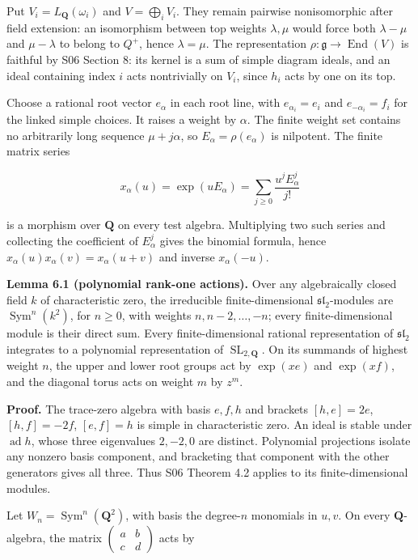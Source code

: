 \documentclass[11pt,a4paper,openany]{report}
\begin{document}
Put \(V_i=L_{\mathbf Q}(\omega_i)\) and \(V=\bigoplus_iV_i\). They remain pairwise nonisomorphic after field extension: an isomorphism between top weights \(\lambda,\mu\) would force both \(\lambda-\mu\) and \(\mu-\lambda\) to belong to \(Q^+\), hence \(\lambda=\mu\). The representation \(\rho:\mathfrak g\to\operatorname{End}(V)\) is faithful by S06 Section 8: its kernel is a sum of simple diagram ideals, and an ideal containing index \(i\) acts nontrivially on \(V_i\), since \(h_i\) acts by one on its top.

Choose a rational root vector \(e_\alpha\) in each root line, with \(e_{\alpha_i}=e_i\) and \(e_{-\alpha_i}=f_i\) for the linked simple choices. It raises a weight by \(\alpha\). The finite weight set contains no arbitrarily long sequence \(\mu+j\alpha\), so \(E_\alpha=\rho(e_\alpha)\) is nilpotent. The finite matrix series

\[
x_\alpha(u)=\exp(uE_\alpha)
=\sum_{j\ge0}\frac{u^jE_\alpha^j}{j!}
\]

is a morphism over \(\mathbf Q\) on every test algebra. Multiplying two such series and collecting the coefficient of \(E_\alpha^j\) gives the binomial formula, hence \(x_\alpha(u)x_\alpha(v)=x_\alpha(u+v)\) and inverse \(x_\alpha(-u)\).

\textbf{Lemma 6.1 (polynomial rank-one actions).} Over any algebraically closed field \(k\) of characteristic zero, the irreducible finite-dimensional \(\mathfrak{sl}_2\)-modules are \(\operatorname{Sym}^n(k^2)\), for \(n\geq0\), with weights \(n,n-2,\ldots,-n\); every finite-dimensional module is their direct sum. Every finite-dimensional rational representation of \(\mathfrak{sl}_2\) integrates to a polynomial representation of \(\operatorname{SL}_{2,\mathbf Q}\). On its summands of highest weight \(n\), the upper and lower root groups act by \(\exp(xe)\) and \(\exp(xf)\), and the diagonal torus acts on weight \(m\) by \(z^m\).

\textbf{Proof.} The trace-zero algebra with basis \(e,f,h\) and brackets \([h,e]=2e\), \([h,f]=-2f\), \([e,f]=h\) is simple in characteristic zero. An ideal is stable under \(\operatorname{ad}h\), whose three eigenvalues \(2,-2,0\) are distinct. Polynomial projections isolate any nonzero basis component, and bracketing that component with the other generators gives all three. Thus S06 Theorem 4.2 applies to its finite-dimensional modules.

Let \(W_n=\operatorname{Sym}^n(\mathbf Q^2)\), with basis the degree-\(n\) monomials in \(u,v\). On every \(\mathbf Q\)-algebra, the matrix \(\left(\begin{smallmatrix}a&b\\c&d\end{smallmatrix}\right)\) acts by
\end{document}
